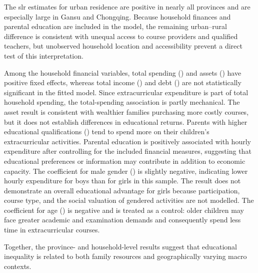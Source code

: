 \documentclass[times]{interact}
\theoremstyle{plain}%
\theoremstyle{definition}
\theoremstyle{remark}
\begin{document}
The \gls{slr} estimates for urban residence are positive in nearly all provinces and are especially large in Gansu and Chongqing.
Because household finances and parental education are included in the model, the remaining urban--rural difference is consistent with unequal access to course providers and qualified teachers, but unobserved household location and accessibility prevent a direct test of this interpretation.


Among the household financial variables, total spending (\TotalSpending) and assets (\Asset) have positive fixed effects, whereas total income (\TotalIncome) and debt (\Debt) are not statistically significant in the fitted model.
Since extracurricular expenditure is part of total household spending, the total-spending association is partly mechanical.
The asset result is consistent with wealthier families purchasing more costly courses, but it does not establish differences in educational returns.
Parents with higher educational qualifications (\HighEducated) tend to spend more on their children's extracurricular activities. Parental education is positively associated with hourly expenditure after controlling for the included financial measures, suggesting that educational preferences or information may contribute in addition to economic capacity.
The coefficient for male gender (\GenderMale) is slightly negative, indicating lower hourly expenditure for boys than for girls in this sample.
The result does not demonstrate an overall educational advantage for girls because participation, course type, and the social valuation of gendered activities are not modelled.
The coefficient for age (\Age) is negative and is treated as a control: older children may face greater academic and examination demands and consequently spend less time in extracurricular courses.

Together, the province- and household-level results suggest that educational inequality is related to both family resources and geographically varying macro contexts.

\end{document}
